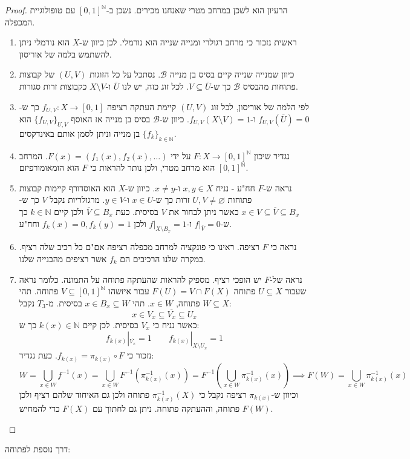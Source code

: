 \documentclass{tstextbook}
\begin{document}
\begin{proof}
הרעיון הוא לשכן במרחב מטרי שאנחנו מכירים. נשכן ב-\([0,1]^{\mathbb{N}}\) עם טופולוגיית המכפלה.

  \begin{enumerate}
    \item ראשית נזכור כי מרחב רגולרי ומנייה שנייה הוא נורמלי. לכן כיוון ש-\(X\) הוא נורמלי ניתן להשתמש בלמה של אוריסון. 


    \item כיוון שמנייה שנייה קיים בסיס בן מנייה \(\mathcal{B}\). נסתכל על כל הזוגות \((U,V)\) של קבוצות פתוחות מהבסיס \(\mathcal{B}\) כך ש-\(V\subseteq\overline{U}\). לכל זוג כזה, יש לנו \(\overline{U}\) ו-\(X\setminus V\) כקבוצות זרות סגורות. 


    \item לפי הלמה של אוריסון, לכל זוג \((U,V)\) קיימת העתקה רציפה \(f_{U,V}:X\to[0,1]\) כך ש-\(f_{U,V}\left( \overline{U} \right)=0\) ו-\(f_{U,V}\left( X\setminus V \right)=1\). כיוון ש-\(\mathcal{B}\) בסיס בן מנייה אז האוסף \(\{ f_{U,V} \}_{U,V}\) הוא בן מנייה וניתן לסמן אותם באינדקסים \(\{ f_{k} \}_{k \in \mathbb{N}}\). 


    \item נגדיר שיכון \(F:X\to [0,1]^{\mathbb{N}}\) על ידי \(F(x)=\left( f_{1}(x),f_{2}(x),\dots \right)\). המרחב \([0,1]^{\mathbb{N}}\) הוא מרחב מטרי, ולכן נותר להראות כי \(F\) הוא הומאומורפיזם. 


    \item נראה ש-\(F\) חח"ע - נניח \(x,y \in X\) ו-\(x \neq y\). כיוון ש-\(X\) הוא האוסדורף קיימות קבוצות פתוחות \(U,V\neq \varnothing\) זרות כך ש-\(x \in U\) ו-\(y \in V\). מרגולריות נקבל \(V\) כך ש-\(x \in V \subseteq \overline{V}\subseteq B_{x}\) כאשר ניתן לבחור את \(V\) בסיסית. כעת \(\overline{V}\subseteq B_{x}\) ולכן קיים \(k \in \mathbb{N}\) כך ש-\(f|_{\overline{V}}=0\) ו-\(f|_{X\setminus B_{x}}=1\) ולכן \(f_{k}(x)=0,f_{k}(y)=1\) וחח"ע. 


    \item נראה כי \(F\) רציפה. ראינו כי פונקציה למרחב מכפלה רציפה אם"ם כל רכיב שלה רציף. במקרה שלנו הרכיבים הם \(f_{k}\) אשר רציפים מהבנייה שלנו. 


    \item נראה של-\(F\) יש הופכי רציף. מספיק להראות שהעתקה פתוחה על התמונה. כלומר נראה שעבור \(U\subseteq X\) פתוחה \(F(U)=V\cap F(X)\) עבור איזשהו \(V\subseteq [0,1]^{\mathbb{N}}\) פתוחה. תהי \(W \subseteq X\) פתוחה, \(x \in W\). תהי \(x \in B_{x}\subseteq W\) בסיסית. מ-\(T_{3}\) נקבל: 
$$x \in V_{x}\subseteq \overline{V_{x}} \subseteq U_{x}$$
כאשר נניח כי \(V_{x}\) בסיסית. לכן קיים \(k(x) \in \mathbb{N}\) כך ש:
$$f_{k(x)}|_{\overline{V_{x}} }=1\qquad f_{k(x)}|_{X\setminus  U_{x}}=1$$
נזכור כי \(f_{k(x)}=\pi_{k(x)}\circ F\). כעת נגדיר:
$$W=\bigcup_{x \in W}f ^{-1}(x)=\bigcup_{x \in W} F ^{-1}\left( \pi_{k(x)}^{-1}(x) \right)=F^{-1}\left( \bigcup_{x \in W}\pi_{k(x)}^{-1}(x) \right)\implies F(W)=\bigcup_{x \in W}\pi_{k(x)}^{-1}(x)$$
וכיוון ש-\(\pi_{k(x)}\) רציפה נקבל כי \(\pi_{k(x)}^{-1}(X)\) פתוחה ולכן גם האיחוד שלהם רציף ולכן \(F(W)\) פתוחה, וההעתקה פתוחה. ניתן גם לחתוך עם \(F(X)\) כדי להמחיש.


  \end{enumerate}
\end{proof}
דרך נוספת לפתוחה:
\end{document}
